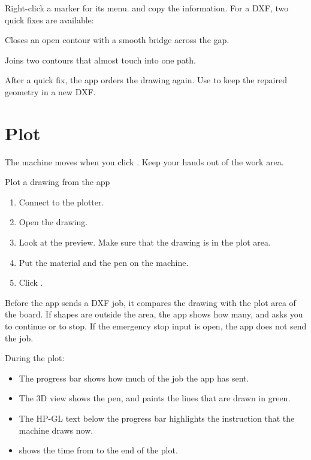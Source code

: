 Right-click a marker for its menu.  and
 copy the information. For a DXF, two quick fixes are
available:

\begin{description}[style=nextline,leftmargin=1.2em,font=\sffamily\bfseries\color{navy}]
  \item[Quick fix: close contour] Closes an open contour with a smooth bridge
        across the gap.
  \item[Quick fix: connect across pen-up] Joins two contours that almost touch
        into one path.
\end{description}

After a quick fix, the app orders the drawing again. Use
 to keep the repaired geometry in a
new DXF.

\section{Plot}

\begin{warning}
The machine moves when you click . Keep your hands out of the work
area.
\end{warning}

\begin{procedure}{Plot a drawing from the app}
\begin{enumerate}
  \item Connect to the plotter.
  \item Open the drawing.
  \item Look at the preview. Make sure that the drawing is in the plot area.
  \item Put the material and the pen on the machine.
  \item Click .
\end{enumerate}
\end{procedure}

Before the app sends a DXF job, it compares the drawing with the plot area of
the board. If shapes are outside the area, the app shows how many, and asks
you to continue or to stop. If the emergency stop input is open, the app does
not send the job.

During the plot:

\begin{itemize}
  \item The progress bar shows how much of the job the app has sent.
  \item The 3D view shows the pen, and paints the lines that are drawn in green.
  \item The HP-GL text below the progress bar highlights the instruction that
        the machine draws now.
  \item {} shows the time from  to the end of the plot.
\end{itemize}

